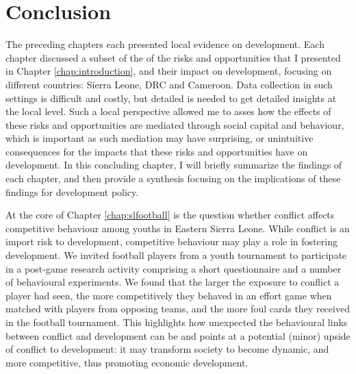 \chapter{Conclusion}
\label{chap:conclusion}
The preceding chapters each presented local evidence on development. Each chapter discussed a subset of the of the risks and opportunities that I presented in Chapter \ref{chap:introduction}, and their impact on development, focusing on different countries: Sierra Leone, DRC and Cameroon. Data collection in such settings is difficult and costly, but detailed is needed to get detailed insights at the local level. Such a local perspective allowed me to asses how the effects of these risks and opportunities are mediated through social capital and behaviour, which is important as such mediation may have surprising, or unintuitive consequences for the impacts that these risks and opportunities have on development. In this concluding chapter, I will briefly summarize the findings of each chapter, and then provide a synthesis focusing on the implications of these findings for development policy.

At the core of Chapter \ref{chap:slfootball} is the question whether conflict affects competitive behaviour among youths in Eastern Sierra Leone. While conflict is an import risk to development, competitive behaviour may play a role in fostering development. We invited football players from a youth tournament to participate in a post-game research activity comprising a short questionnaire and a number of behavioural experiments. We found that the larger the exposure to conflict a player had seen, the more competitively they behaved in an effort game when matched with players from opposing teams, and the more foul cards they received in the football tournament. This highlights how unexpected the behavioural links between conflict and development can be and points at a potential (minor) upside of conflict to development: it may transform society to become dynamic, and more competitive, thus promoting economic development.


